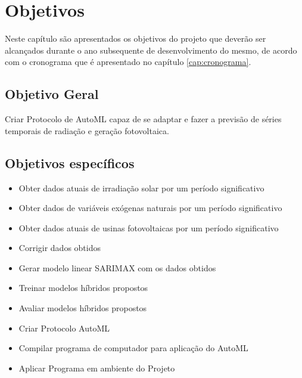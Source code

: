 \chapter{Objetivos}
\label{cap:objetivos}

Neste capítulo são apresentados os objetivos do projeto que deverão ser alcançados durante o ano subsequente de desenvolvimento do mesmo, de acordo com o cronograma que é apresentado no capítulo \ref{cap:cronograma}.

\section{Objetivo Geral}

Criar Protocolo de AutoML capaz de se adaptar e fazer a previsão de séries temporais de radiação e geração fotovoltaica.

\section{Objetivos específicos}

\begin{itemize}
    \item Obter dados atuais de irradiação solar por um período significativo
    \item Obter dados de variáveis exógenas naturais por um período significativo
    \item Obter dados atuais de usinas fotovoltaicas por um período significativo
    \item Corrigir dados obtidos
    \item Gerar modelo linear SARIMAX com os dados obtidos
    \item Treinar modelos híbridos propostos
    \item Avaliar modelos híbridos propostos
    \item Criar Protocolo AutoML
    \item Compilar programa de computador para aplicação do AutoML
    \item Aplicar Programa em ambiente do Projeto
\end{itemize}
